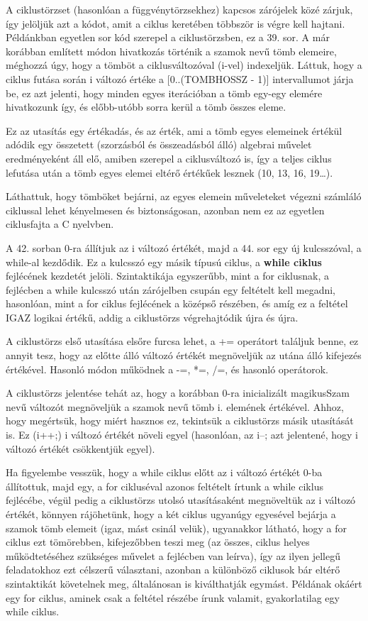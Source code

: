 A ciklustörzset (hasonlóan a függvénytörzsekhez) kapcsos zárójelek közé zárjuk, így jelöljük azt a kódot, amit a ciklus keretében többször is végre kell hajtani.
Példánkban egyetlen sor kód szerepel a ciklustörzsben, ez a 39. sor. A már korábban említett módon hivatkozás történik a szamok nevű tömb elemeire, méghozzá úgy, hogy a tömböt a ciklusváltozóval (i-vel) indexeljük. Láttuk, hogy a ciklus futása során i változó értéke a [0..(TOMB\textunderscore HOSSZ - 1)] intervallumot járja be, ez azt jelenti, hogy minden egyes iterációban a tömb egy-egy elemére hivatkozunk így, és előbb-utóbb sorra kerül a tömb összes eleme.

Ez az utasítás egy értékadás, és az érték, ami a tömb egyes elemeinek értékül adódik egy összetett (szorzásból és összeadásból álló) algebrai művelet eredményeként áll elő, amiben szerepel a ciklusváltozó is, így a teljes ciklus lefutása után a tömb egyes elemei eltérő értékűek lesznek (10, 13, 16, 19\ldots).

Láthattuk, hogy tömböket bejárni, az egyes elemein műveleteket végezni számláló ciklussal lehet kényelmesen és biztonságosan, azonban nem ez az egyetlen ciklusfajta a C nyelvben.

A 42. sorban 0-ra állítjuk az i változó értékét, majd a 44. sor egy új kulcsszóval, a while-al kezdődik. Ez a kulcsszó egy másik típusú ciklus, a \textbf{while ciklus} fejlécének kezdetét jelöli. Szintaktikája egyszerűbb, mint a for ciklusnak, a fejlécben a while kulcsszó után zárójelben csupán egy feltételt kell megadni, hasonlóan, mint a for ciklus fejlécének a középső részében, és amíg ez a feltétel IGAZ logikai értékű, addig a ciklustörzs végrehajtódik újra és újra.

A ciklustörzs első utasítása elsőre furcsa lehet, a += operátort találjuk benne, ez annyit tesz, hogy az előtte álló változó értékét megnöveljük az utána álló kifejezés értékével. Hasonló módon működnek a -=, *=, /=, és hasonló operátorok.

A ciklustörzs jelentése tehát az, hogy a korábban 0-ra inicializált magikusSzam nevű változót megnöveljük a szamok nevű tömb i. elemének értékével. Ahhoz, hogy megértsük, hogy miért hasznos ez, tekintsük a ciklustörzs másik utasítását is. Ez (i++;) i változó értékét növeli egyel (hasonlóan, az i--; azt jelentené, hogy i változó értékét csökkentjük egyel).

Ha figyelembe vesszük, hogy a while ciklus előtt az i változó értékét 0-ba állítottuk, majd egy, a for cikluséval azonos feltételt írtunk a while ciklus fejlécébe, végül pedig a ciklustörzs utolsó utasításaként megnöveltük az i változó értékét, könnyen rájöhetünk, hogy a két ciklus ugyanúgy egyesével bejárja a szamok tömb elemeit (igaz, mást csinál velük), ugyanakkor látható, hogy a for ciklus ezt tömörebben, kifejezőbben teszi meg (az összes, ciklus helyes működtetéséhez szükséges művelet a fejlécben van leírva), így az ilyen jellegű feladatokhoz ezt célszerű választani, azonban a különböző ciklusok bár eltérő szintaktikát követelnek meg, általánosan is kiválthatják egymást. Példának okáért egy for ciklus, aminek csak a feltétel részébe írunk valamit, gyakorlatilag egy while ciklus.

